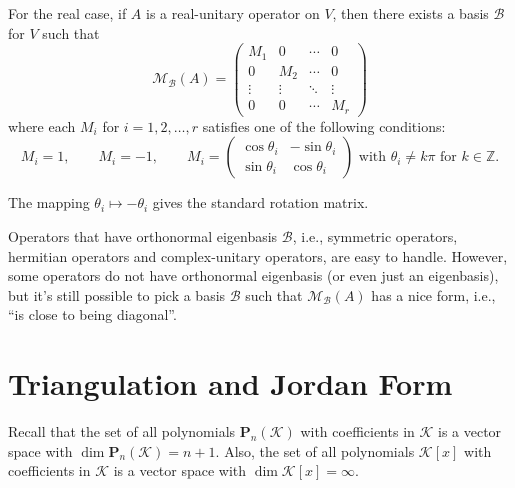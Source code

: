 \documentclass{ctexart}
\newcommand{\Z}{\mathbb{Z}}
\begin{document}
    \begin{mycor}
        For the real case, if $A$ is a real-unitary operator on $V$, then there exists a basis $\mathcal{B}$ for $V$ such that 
        $$\mathcal M_{\mathcal{B}}(A) = \begin{pmatrix}
            M_1 & 0 & \cdots & 0 \\
            0 & M_2 & \cdots & 0 \\
            \vdots & \vdots & \ddots & \vdots \\
            0 & 0 & \cdots & M_r
        \end{pmatrix}$$
        where each $M_i$ for $i=1,2,\ldots,r$ satisfies one of the following conditions:
        $$ M_i = 1,\qquad M_i = -1, \qquad M_i = \begin{pmatrix}
            \cos \theta_i & -\sin \theta_i \\
            \sin \theta_i & \cos \theta_i
        \end{pmatrix} \text{ with } \theta_i \neq k\pi \text{ for } k\in \Z. $$
    \end{mycor}
    \begin{myrmk}
        The mapping $\theta_i \mapsto -\theta_i$ gives the standard rotation matrix.
    \end{myrmk}
    \begin{myrmk}
        Operators that have orthonormal eigenbasis $\mathcal B$, i.e., symmetric operators, hermitian operators and complex-unitary operators, are easy to handle. However, some operators do not have orthonormal eigenbasis (or even just an eigenbasis), but it's still possible to pick a basis $\mathcal B$ such that $\mathcal M_{\mathcal B}(A)$ has a nice form, i.e., ``is close to being diagonal''.
    \end{myrmk}

    \newpage
    \section{Triangulation and Jordan Form}
    Recall that the set of all polynomials $\mathbf P_n(\mathcal{K})$ with coefficients in $\mathcal{K}$ is a vector space with $\dim \mathbf P_n(\mathcal{K}) = n+1$. Also, the set of all polynomials $\mathcal{K}[x]$ with coefficients in $\mathcal{K}$ is a vector space with $\dim \mathcal K[x] = \infty$. 
\end{document}

